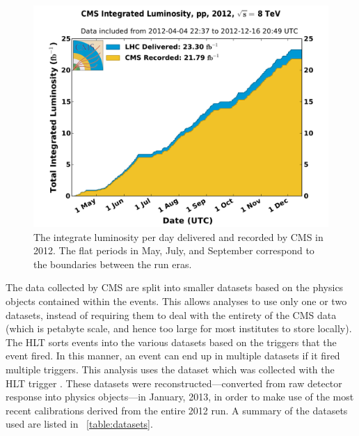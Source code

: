 \begin{figure}[!htbp]
    \centering
    \includegraphics[width=\textwidth]{figures/2012_lumi.pdf}
    \caption{The integrate luminosity per day delivered and recorded by CMS in
        2012. The flat periods in May, July, and September correspond to the
        boundaries between the run eras.}
    \label{fig:2012_luminosity}
\end{figure}

The data collected by CMS are split into smaller datasets based on the physics
objects contained within the events. This allows analyses to use only one or
two datasets, instead of requiring them to deal with the entirety of the CMS
data (which is petabyte scale, and hence too large for most institutes to store
locally). The HLT sorts events into the various datasets based on the triggers
that the event fired. In this manner, an event can end up in multiple datasets
if it fired multiple triggers. This analysis uses the \SingleElectron dataset
which was collected with the HLT trigger \SingleElectronTrigger. These datasets
were reconstructed---converted from raw detector response into physics
objects---in January, 2013, in order to make use of the most recent
calibrations derived from the entire 2012 run. A summary of the datasets used
are listed in \TAB~\ref{table:datasets}.

